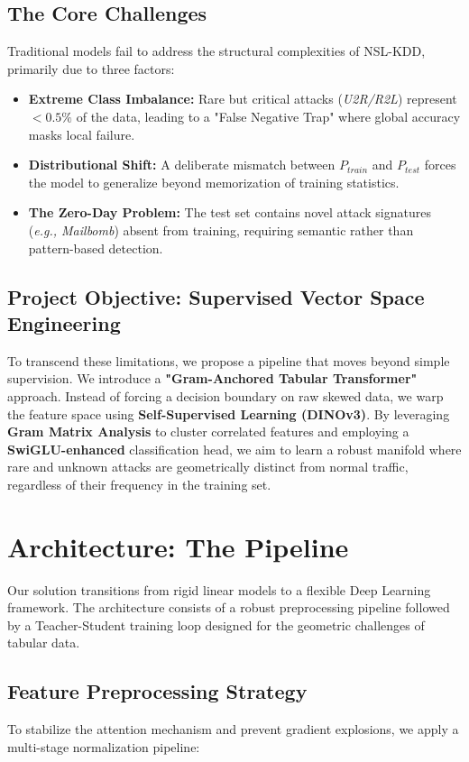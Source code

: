 \documentclass[
  10pt,
  twocolumn,
  a4paper,
  parskip=half
]{scrartcl}
\begin{document}
\subsection{The Core Challenges}
Traditional models fail to address the structural complexities of NSL-KDD, primarily due to three factors:
\begin{itemize}
    \item \textbf{Extreme Class Imbalance:} Rare but critical attacks (\textit{U2R/R2L}) represent $<0.5\%$ of the data, leading to a "False Negative Trap" where global accuracy masks local failure.
    \item \textbf{Distributional Shift:} A deliberate mismatch between $P_{train}$ and $P_{test}$ forces the model to generalize beyond memorization of training statistics.
    \item \textbf{The Zero-Day Problem:} The test set contains novel attack signatures (\textit{e.g., Mailbomb}) absent from training, requiring semantic rather than pattern-based detection.
\end{itemize}

    \subsection{Project Objective: Supervised Vector Space Engineering}
    To transcend these limitations, we propose a pipeline that moves beyond simple supervision. We introduce a \textbf{"Gram-Anchored Tabular Transformer"} approach.
    Instead of forcing a decision boundary on raw skewed data, we warp the feature space using \textbf{Self-Supervised Learning (DINOv3)}. By leveraging \textbf{Gram Matrix Analysis} to cluster correlated features and employing a \textbf{SwiGLU-enhanced} classification head, we aim to learn a robust manifold where rare and unknown attacks are geometrically distinct from normal traffic, regardless of their frequency in the training set.

\section{Architecture: The Pipeline}

Our solution transitions from rigid linear models to a flexible Deep Learning framework. The architecture consists of a robust preprocessing pipeline followed by a Teacher-Student training loop designed for the geometric challenges of tabular data.

\subsection{Feature Preprocessing Strategy}
To stabilize the attention mechanism and prevent gradient explosions, we apply a multi-stage normalization pipeline:
\end{document}
